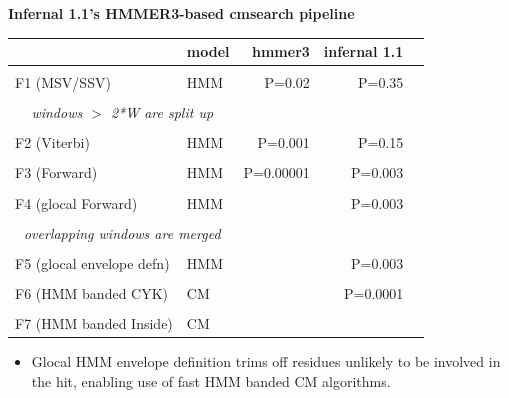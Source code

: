 \documentclass[landscape]{slides}
\begin{document}
\begin{slide}
\begin{center}
\textbf{Infernal 1.1's HMMER3-based cmsearch pipeline}
\medskip

\tiny
\begin{tabular}{ll||r|r|r}
  & model         & hmmer3 & infernal 1.1 \\ \hline
& & & \\
F1 (MSV/SSV)  & HMM & P=0.02     & P=0.35 \\
& & & \\
\multicolumn{2}{c||}{\emph{windows $>$ 2*W are split up}} & & & \\
& & & \\
F2 (Viterbi) & HMM & P=0.001    & P=0.15 \\
& & & \\
F3 (Forward) & HMM & P=0.00001  & P=0.003 \\
& & & \\
F4 (glocal Forward) & HMM &     & P=0.003 \\
& & & \\
\multicolumn{2}{c||}{\emph{overlapping windows are merged}} & & & \\
& & & \\
F5 (glocal envelope defn)  & HMM & & P=0.003 \\
& & & \\
F6 (HMM banded CYK)  & CM &    & P=0.0001 \\
& & & \\
F7 (HMM banded Inside)& CM &  &      \\ %
\end{tabular}
\end{center}

\small
\begin{itemize}
\item
Glocal HMM envelope definition trims off residues unlikely to be involved
in the hit, enabling use of fast HMM banded CM algorithms.
\end{itemize}

\vfill

\end{slide}
\end{document}
